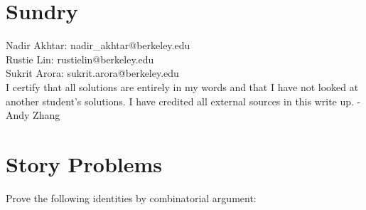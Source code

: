 \documentclass[11pt]{article}
\newcommand*{\Question}[1]{\section{#1}}
\begin{document}
\Question{Sundry} 
\vspace{10pt}
\noindent Nadir Akhtar: nadir\_akhtar@berkeley.edu\\
Rustie Lin: rustielin@berkeley.edu\\
Sukrit Arora: sukrit.arora@berkeley.edu\\

I certify that all solutions are entirely in my words and that I have not looked at another student’s
solutions. I have credited all external sources in this write up. - Andy Zhang
\vfill\pagebreak[3]

\Question{Story Problems}

\newcommand{\sblank}{\vspace{1in}}
Prove the following identities by combinatorial argument:
\end{document}

